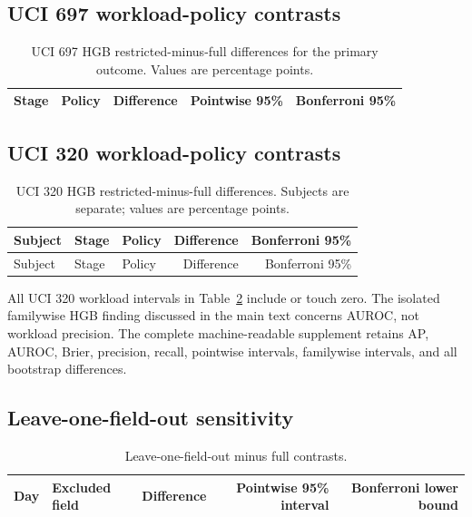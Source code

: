 \subsection{UCI 697 workload-policy contrasts}

\begin{table}[htbp]
\centering
\caption{UCI 697 HGB restricted-minus-full \Pten{} differences for the primary outcome. Values are percentage points.}
\label{tab:s_uci697}
\footnotesize
\begin{tabular}{llrrr}
\toprule
Stage & Policy & Difference & Pointwise 95\% & Bonferroni 95\% \\
\midrule

\end{tabular}
\end{table}
\FloatBarrier

\subsection{UCI 320 workload-policy contrasts}

\small
\begin{longtable}{lllrr}
\caption{UCI 320 HGB restricted-minus-full \Pten{} differences. Subjects are separate; values are percentage points.}\label{tab:s_uci320}\\
\toprule
Subject & Stage & Policy & Difference & Bonferroni 95\% \\
\midrule
\endfirsthead
\toprule
Subject & Stage & Policy & Difference & Bonferroni 95\% \\
\midrule
\endhead

\end{longtable}
\normalsize

All UCI 320 workload intervals in Table~\ref{tab:s_uci320} include or touch zero. The isolated familywise HGB finding discussed in the main text concerns AUROC, not workload precision. The complete machine-readable supplement retains AP, AUROC, Brier, precision, recall, pointwise intervals, familywise intervals, and all bootstrap differences.

\subsection{Leave-one-field-out sensitivity}

\begin{table}[htbp]
\centering
\caption{Leave-one-field-out minus full \Pten{} contrasts.}
\label{tab:s_loo}
\footnotesize
\begin{tabular}{llrrr}
\toprule
Day & Excluded field & Difference & Pointwise 95\% interval & Bonferroni lower bound \\
\midrule

\end{tabular}
\end{table}
\FloatBarrier

